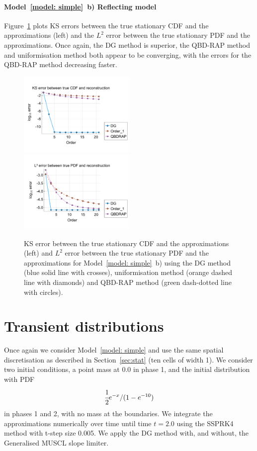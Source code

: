 \paragraph{Model~\ref{model: simple}~b) Reflecting model}
Figure~\ref{fig: reflecting stationary} plots KS errors between the true stationary CDF and the approximations (left) and the \(L^2\) error between the true stationary PDF and the approximations. Once again, the DG method is superior, the QBD-RAP method and uniformisation method both appear to be converging, with the errors for the QBD-RAP method decreasing faster.
\begin{figure}
	\centering
	\includegraphics[width=0.5\textwidth,trim={0.75cm 0.8cm 0.25cm 1.25cm},clip]{chapter6/figs/hitting_times_model/reflecting_model/stationary_distribution/ks_error_formatted.pdf}%
	\includegraphics[width=0.5\textwidth,trim={0.75cm 0.8cm 0.25cm 1.25cm},clip]{chapter6/figs/hitting_times_model/reflecting_model/stationary_distribution/l2_pdf_error_formatted.pdf}
	\caption{KS error between the true stationary CDF and the approximations (left) and \(L^2\) error between the true stationary PDF and the approximations for Model~\ref{model: simple}~b) using the DG method (blue solid line with crosses), uniformisation method (orange dashed line with diamonds) and QBD-RAP method (green dash-dotted line with circles).} 
	\label{fig: reflecting stationary} 
\end{figure}

\section{Transient distributions}
Once again we consider Model~\ref{model: simple} and use the same spatial discretisation as described in Section~\ref{sec:stat} (ten cells of width 1). We consider two initial conditions, a point mass at 0.0 in phase 1, and the initial distribution with PDF 
\begin{align}
	\cfrac{1}{2}e^{-x}/(1-e^{-10})\label{eqn: exp init cond}
\end{align}
in phases 1 and 2, with no mass at the boundaries. We integrate the approximations numerically over time until time \(t=2.0\) using the SSPRK4 method with t-step size 0.005. We apply the DG method with, and without, the Generalised MUSCL slope limiter. 

